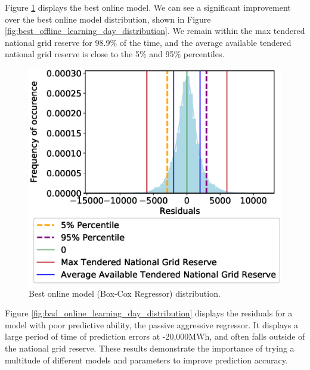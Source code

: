 \documentclass[final,3p,times,twocolumn,numbers]{elsarticle}
\begin{document}
Figure \ref{fig:best_online_learning_day_distribution} displays the best online model. We can see a significant improvement over the best online model distribution, shown in Figure \ref{fig:best_offline_learning_day_distribution}. We remain within the max tendered national grid reserve for 98.9\% of the time, and the average available tendered national grid reserve is close to the 5\% and 95\% percentiles.



\begin{figure}[h]
\centering
\includegraphics[width=\columnwidth,natwidth=500,natheight=485]{figures/results/online_learning_dists-power-0.1.eps}
\caption{Best online model (Box-Cox Regressor) distribution.}
\label{fig:best_online_learning_day_distribution}
\end{figure}

Figure \ref{fig:bad_online_learning_day_distribution} displays the residuals for a model with poor predictive ability, the passive aggressive regressor. It displays a large period of time of prediction errors at -20,000MWh, and often falls outside of the national grid reserve. These results demonstrate the importance of trying a multitude of different models and parameters to improve prediction accuracy.
\end{document}
